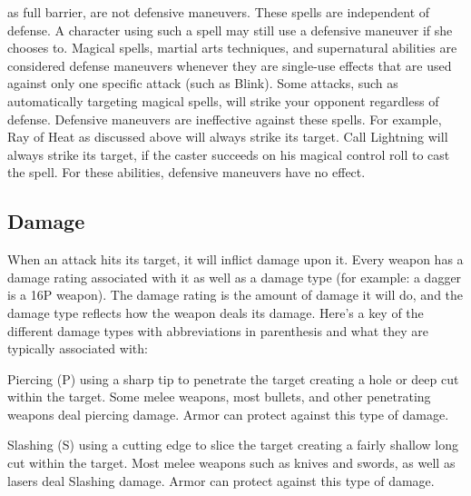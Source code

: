 \documentclass[twoside]{book}
\begin{document}
              as full barrier, are not defensive maneuvers. These
              spells are independent of defense. A character using
              such a spell may still use a defensive maneuver if she
              chooses to.  Magical spells, martial arts techniques,
              and supernatural abilities are considered defense
              maneuvers whenever they are single-use effects that are
              used against only one specific attack (such as
              Blink). Some attacks, such as
              automatically targeting magical spells, will strike your
              opponent regardless of defense. Defensive maneuvers are
              ineffective against these spells. For example, Ray of
              Heat as discussed above will always strike its
              target. Call Lightning will always strike its target, if
              the caster succeeds on his magical control roll to cast
              the spell. For these abilities, defensive maneuvers have
              no effect. 
            
\subsection{Damage}
     When an attack hits its target, it will inflict
               damage upon it. Every weapon has a damage rating
               associated with it as well as a damage type (for example:
               a dagger is a 16P weapon). The damage rating is the
               amount of damage it will do, and the damage type reflects
               how the weapon deals its damage.  Here's a key of the different damage types
               with abbreviations in parenthesis and what they are
               typically associated with:   
                
                 Piercing (P)   
                    using a sharp tip to penetrate the target
                   creating a hole or deep cut within the target. Some
                   melee weapons, most bullets, and other penetrating
                   weapons deal piercing damage. Armor can protect
                   against this type of damage. 
                
                
                 Slashing (S)   
                    using a cutting edge to slice the target
                   creating a fairly shallow long cut within the target.
                   Most melee weapons such as knives and swords, as well
                   as lasers deal Slashing damage. Armor can protect
                   against this type of damage. 
                
\end{document}

